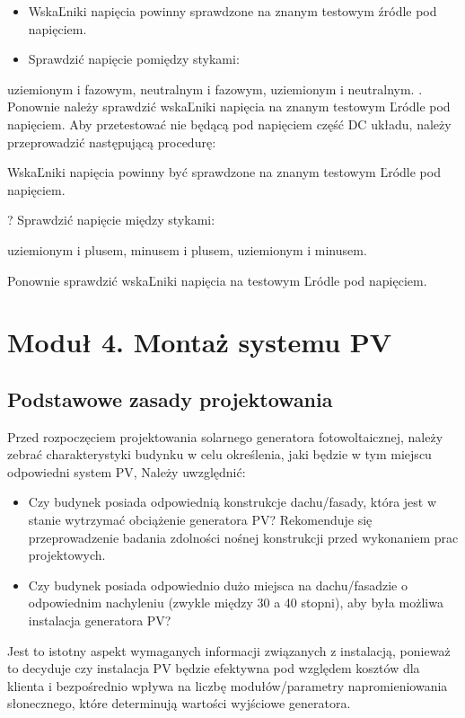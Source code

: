 \documentclass[12pt,a4paper]{article}
\begin{document}
\begin{itemize}
\item WskaĽniki napięcia powinny sprawdzone na znanym testowym źródle 
pod napięciem. 
\item Sprawdzić napięcie pomiędzy stykami: 
\end{itemize}
 uziemionym i fazowym, neutralnym i fazowym, uziemionym i neutralnym. . 
Ponownie należy sprawdzić wskaĽniki napięcia na znanym testowym Ľródle 
pod napięciem. Aby przetestować nie będącą pod napięciem część DC 
układu, należy przeprowadzić następującą procedurę: 

 

WskaĽniki napięcia powinny być sprawdzone na znanym testowym Ľródle pod 
napięciem. 

? Sprawdzić napięcie między stykami: 

uziemionym i plusem, minusem i plusem, uziemionym i minusem. 

Ponownie sprawdzić wskaĽniki napięcia na testowym Ľródle pod napięciem. 



\section{Moduł 4. Montaż systemu PV }

\subsection{Podstawowe zasady projektowania}
  

Przed rozpoczęciem projektowania solarnego generatora fotowoltaicznej, 
należy zebrać charakterystyki budynku w celu określenia, jaki będzie w 
tym miejscu odpowiedni system PV, Należy uwzględnić: 

\begin{itemize}
\item Czy budynek posiada odpowiednią konstrukcje dachu/fasady, która 
jest w stanie wytrzymać obciążenie generatora PV? Rekomenduje się 
przeprowadzenie badania zdolności nośnej konstrukcji przed wykonaniem 
prac projektowych. 
\item Czy budynek posiada odpowiednio dużo miejsca na dachu/fasadzie o 
odpowiednim nachyleniu (zwykle między 30 a 40 stopni), aby była możliwa instalacja generatora PV? 
\end{itemize}

Jest to istotny aspekt wymaganych informacji związanych z 
instalacją, ponieważ to decyduje czy instalacja PV będzie efektywna pod 
względem kosztów dla klienta i bezpośrednio wpływa na liczbę 
modułów/parametry napromieniowania słonecznego, które determinują 
wartości wyjściowe generatora. 
\end{document}
